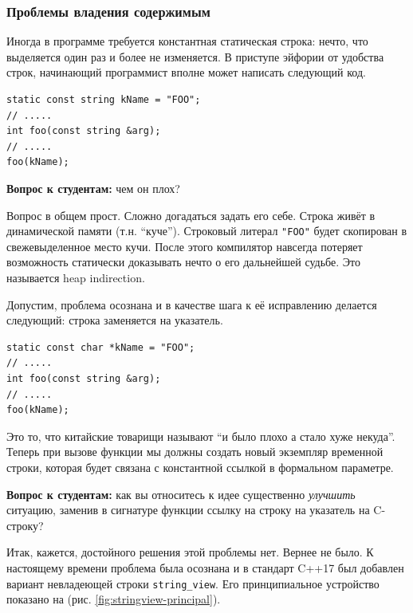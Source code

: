 \documentclass[a4paper,12pt,oneside]{article}
\newif\ifanswers
\begin{document}
\subsubsection{Проблемы владения содержимым}\label{subsub:stringview}

Иногда в программе требуется константная статическая строка: нечто, что выделяется один раз и более не изменяется. В приступе эйфории от удобства строк, начинающий программист вполне может написать следующий код.

\begin{lstlisting}
static const string kName = "FOO";
// .....
int foo(const string &arg);
// .....
foo(kName);
\end{lstlisting}

\textbf{Вопрос к студентам:} чем он плох?

\ifanswers
Ответ ниже.
\fi

Вопрос в общем прост. Сложно догадаться задать его себе. Строка живёт в динамической памяти (т.н. ``куче''). Строковый литерал \lstinline!"FOO"! будет скопирован в свежевыделенное место кучи. После этого компилятор навсегда потеряет возможность статически доказывать нечто о его дальнейшей судьбе. Это называется heap indirection.

Допустим, проблема осознана и в качестве шага к её исправлению делается следующий: строка заменяется на указатель.

\begin{lstlisting}
static const char *kName = "FOO";
// .....
int foo(const string &arg);
// .....
foo(kName);
\end{lstlisting}

Это то, что китайские товарищи называют ``и было плохо а стало хуже некуда''. Теперь при вызове функции мы должны создать новый экземпляр временной строки, которая будет связана с константной ссылкой в формальном параметре.

\textbf{Вопрос к студентам:} как вы относитесь к идее существенно \textit{улучшить} ситуацию, заменив в сигнатуре функции ссылку на строку на указатель на C-строку?

\ifanswers
Правильный ответ: общий смех. Если найдётся несчастный, который согласится с тем, что это хорошая идея, его запинают его же одногруппники
\fi

Итак, кажется, достойного решения этой проблемы нет. Вернее не было. К настоящему времени проблема была осознана и в стандарт C++17 был добавлен вариант невладеющей строки \lstinline!string_view!. Его принципиальное устройство показано на (рис. \ref{fig:stringview-principal}).
\end{document}
